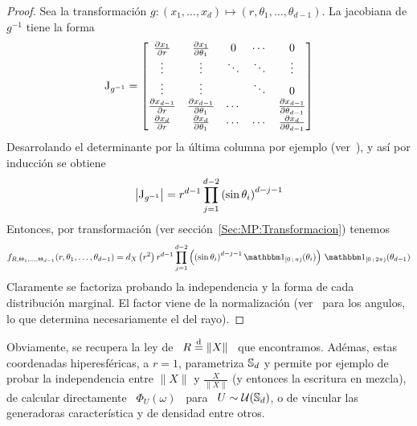 \begin{proof}
  Sea      la       transformaci\'on      $g:      (x_1,\ldots,x_d)      \mapsto
  (r,\theta_1,\ldots,\theta_{d-1})$. La jacobiana de $g^{-1}$ tiene la forma
  \[
  \operatorname{J}_{g^{-1}} = \begin{bmatrix}
    \frac{\partial x_1}{\partial r} & \frac{\partial x_1}{\partial \theta_1} & 0 & \cdots & 0\\
    \vdots & \vdots & \ddots & \ddots & \vdots\\
    \vdots & \vdots &  & \ddots  & 0\\
    \frac{\partial x_{d-1}}{\partial r} & \frac{\partial x_{d-1}}{\partial
    \theta_1} & \cdots & & \frac{\partial x_{d-1}}{\partial \theta_{d-1}}\\
    \frac{\partial x_d}{\partial  r} & \frac{\partial  x_d}{\partial \theta_1} &
    \cdots & \cdots & \frac{\partial x_d}{\partial \theta_{d-1}}
  \end{bmatrix}
  \]
  Desarrolando   el   determinante  por   la   \'ultima   columna  por   ejemplo
  (ver~\cite{Bha97, HorJoh13}), y as\'i por inducci\'on se obtiene
  \[
  \left|   \operatorname{J}_{g^{-1}}  \right|  =   r^{d-1}  \prod_{j=1}^{d-2}   \left(  \sin
    \theta_i\right)^{d-j-1}
  \]
  Entonces,  por  transformaci\'on  (ver  secci\'on~\ref{Sec:MP:Transformacion})
  tenemos
  \[
  f_{R,\Theta_1,\ldots,\Theta_{d-1}}(r,\theta_1,\ldots,\theta_{d-1}) = d_X\left(
    r^2    \right)     r^{d-1}    \prod_{j=1}^{d-2}    \left(     \left(    \sin
      \theta_i\right)^{d-j-1} \un_{[0 \; \pi)}(\theta_i) \right) \, \un_{[0 \; 2
    \pi)}(\theta_{d-1})
  \]
  Claramente  se  factoriza  probando  la  independencia  y  la  forma  de  cada
  distribuci\'on   marginal.    El   factor   viene    de   la   normalizaci\'on
  (ver~\cite[Ec.~8.380-2]{GraRyz15}   para  los   angulos,   lo  que   determina
  necesariamente el del rayo).
\end{proof}
%
Obviamente,   se   recupera   la   ley   de   \   $R   \stackrel{\mathrm{d}}{=}   \|X\|$   \   que
encontramos.  Ad\'emas, estas coordenadas  hiperesf\'ericas, a  $r=1$, parametriza
$\mathbb{S}_d$  y permite  por ejemplo  de probar  la independencia  entre  $\|X\|$ y
$\frac{X}{\|X\|}$ (y entonces la  escritura en mezcla), de calcular directamente
\ $\Phi_U(\omega)$ \ para \ $U  \sim \mathcal{U}(\mathbb{S}_d)$, o de vincular las generadoras
caracter\'istica y de densidad entre otros.


